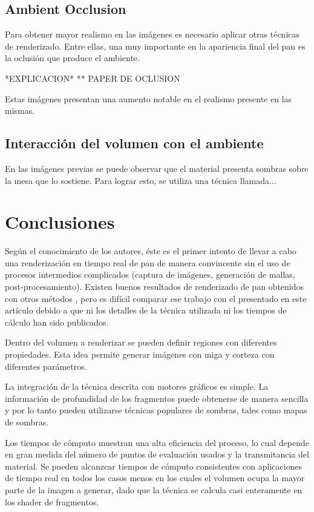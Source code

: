 \documentclass[spanish,a4paper,11pt,oneside,links]{report}
\begin{document}
\subsection{Ambient Occlusion}
Para obtener mayor realismo en las imágenes es necesario aplicar otras técnicas de renderizado. Entre ellas, una muy importante en la apariencia final del pan es la oclusión que produce el ambiente.

*EXPLICACION* 
** PAPER DE OCLUSION

Estas imágenes presentan una aumento notable en el realismo presente en las mismas.

\subsection{Interacción del volumen con el ambiente}
En las imágenes previas se puede observar que el material presenta sombras sobre la mesa que lo sostiene. Para lograr esto, se utiliza una técnica llamada...



\section{Conclusiones}

Según el conocimiento de los autores, éste es el primer intento de llevar a cabo una renderización en tiempo real de pan de manera convincente sin el uso de procesos intermedios complicados (captura de imágenes, generación de mallas, post-procesamiento). Existen buenos resultados de renderizado de pan obtenidos con otros métodos \cite{Cho2007}, pero es difícil comparar ese trabajo con el presentado en este artículo debido a que ni los detalles de la técnica utilizada ni los tiempos de cálculo han sido publicados.

Dentro del volumen a renderizar se pueden definir regiones con diferentes propiedades. Esta idea permite generar imágenes con miga y corteza con diferentes parámetros.

La integración de la técnica descrita con motores gráficos es simple. La información de profundidad de los fragmentos puede obtenerse de manera sencilla y por lo tanto pueden utilizarse técnicas populares de sombras, tales como mapas de sombras.

Los tiempos de cómputo muestran una alta eficiencia del proceso, lo cual depende en gran medida del número de puntos de evaluación usados y la transmitancia del material. Se pueden alcanzcar tiempos de cómputo consistentes con aplicaciones de tiempo real en todos los casos menos en los cuales el volumen ocupa la mayor parte de la imagen a generar, dado que la técnica se calcula casi enteramente en los shader de fragmentos. 
\end{document}
